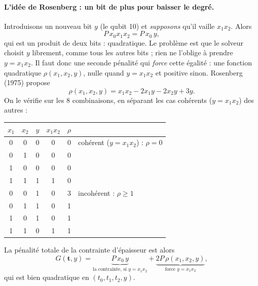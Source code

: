 \paragraph{L'idée de Rosenberg : un bit de plus pour baisser le degré.} Introduisons un nouveau bit $y$ (le qubit 10) et \emph{supposons} qu'il vaille $x_1x_2$. Alors
\[ P\,x_0x_1x_2=P\,x_0\,y, \]
qui est un produit de deux bits : quadratique. Le problème est que le solveur choisit $y$ librement, comme tous les autres bits ; rien ne l'oblige à prendre $y=x_1x_2$. Il faut donc une seconde pénalité qui \emph{force} cette égalité : une fonction quadratique $\rho(x_1,x_2,y)$, nulle quand $y=x_1x_2$ et positive sinon. Rosenberg (1975) propose
\[ \rho(x_1,x_2,y)=x_1x_2-2x_1y-2x_2y+3y. \]
On le vérifie sur les 8 combinaisons, en séparant les cas cohérents ($y=x_1x_2$) des autres :
\begin{center}
\renewcommand{\arraystretch}{1.15}
\small
\begin{tabular}{ccc|c|c|l}
\toprule
$x_1$ & $x_2$ & $y$ & $x_1x_2$ & $\rho$ & \\
\midrule
0&0&0&0&0& cohérent ($y=x_1x_2$) : $\rho=0$ \\
0&1&0&0&0& \\
1&0&0&0&0& \\
1&1&1&1&0& \\
\midrule
0&0&1&0&3& incohérent : $\rho\ge1$ \\
0&1&1&0&1& \\
1&0&1&0&1& \\
1&1&0&1&1& \\
\bottomrule
\end{tabular}
\end{center}
La pénalité totale de la contrainte d'épaisseur est alors
\[ G(\mathbf t,y)=\underbrace{P\,x_0\,y}_{\text{la contrainte, si }y=x_1x_2}+\underbrace{2P\,\rho(x_1,x_2,y)}_{\text{force }y=x_1x_2}, \]
qui est bien quadratique en $(t_0,t_1,t_2,y)$.

